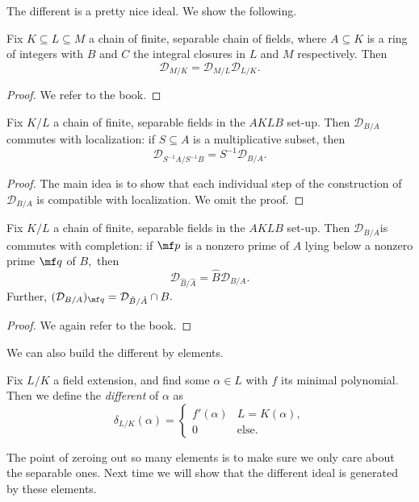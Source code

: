 The different is a pretty nice ideal. We show the following.
\begin{definition}
	Fix $K\subseteq L\subseteq M$ a chain of finite, separable chain of fields, where $A\subseteq K$ is a ring of integers with $B$ and $C$ the integral closures in $L$ and $M$ respectively. Then
	\[\mathcal D_{M/K}=\mathcal D_{M/L}\mathcal D_{L/K}.\]
\end{definition}
\begin{proof}
	We refer to the book.
\end{proof}
\begin{prop}
	Fix $K/L$ a chain of finite, separable fields in the $AKLB$ set-up. Then $\mathcal D_{B/A}$ commutes with localization: if $S\subseteq A$ is a multiplicative subset, then 
	\[\mathcal D_{S^{-1}A/S^{-1}B}=S^{-1}\mathcal D_{B/A}.\]
\end{prop}
\begin{proof}
	The main idea is to show that each individual step of the construction of $\mathcal D_{B/A}$ is compatible with localization. We omit the proof.
\end{proof}
\begin{proposition}
	Fix $K/L$ a chain of finite, separable fields in the $AKLB$ set-up. Then $\mathcal D_{B/A}$is commutes with completion: if $\mf p$ is a nonzero prime of $A$ lying below a nonzero prime $\mf q$ of $B,$ then
	\[\mathcal D_{\hat B/\hat A}=\hat B\mathcal D_{B/A}.\]
	Further, $(\mathcal D_{B/A})_{\mf q}=\mathcal D_{\hat B/\hat A}\cap B.$
\end{proposition}
\begin{proof}
	We again refer to the book.
\end{proof}
We can also build the different by elements.
\begin{definition}
	Fix $L/K$ a field extension, and find some $\alpha\in L$ with $f$ its minimal polynomial. Then we define the \textit{different} of $\alpha$ as
	\[\delta_{L/K}(\alpha)=\begin{cases}
		f'(\alpha) & L=K(\alpha), \\
		0 & \text{else}.
	\end{cases}\]
\end{definition}
The point of zeroing out so many elements is to make sure we only care about the separable ones. Next time we will show that the different ideal is generated by these elements.